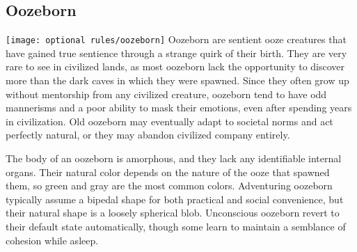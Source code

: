     \subsection{Oozeborn}
        \texttt{[image: optional rules/oozeborn]}
        Oozeborn are sentient ooze creatures that have gained true sentience through a strange quirk of their birth.
        They are very rare to see in civilized lands, as most oozeborn lack the opportunity to discover more than the dark caves in which they were spawned.
        Since they often grow up without mentorship from any civilized creature, oozeborn tend to have odd mannerisms and a poor ability to mask their emotions, even after spending years in civilization.
        Old oozeborn may eventually adapt to societal norms and act perfectly natural, or they may abandon civilized company entirely.

        The body of an oozeborn is amorphous, and they lack any identifiable internal organs.
        Their natural color depends on the nature of the ooze that spawned them, so green and gray are the most common colors.
        Adventuring oozeborn typically assume a bipedal shape for both practical and social convenience, but their natural shape is a loosely spherical blob.
        Unconscious oozeborn revert to their default state automatically, though some learn to maintain a semblance of cohesion while asleep.

